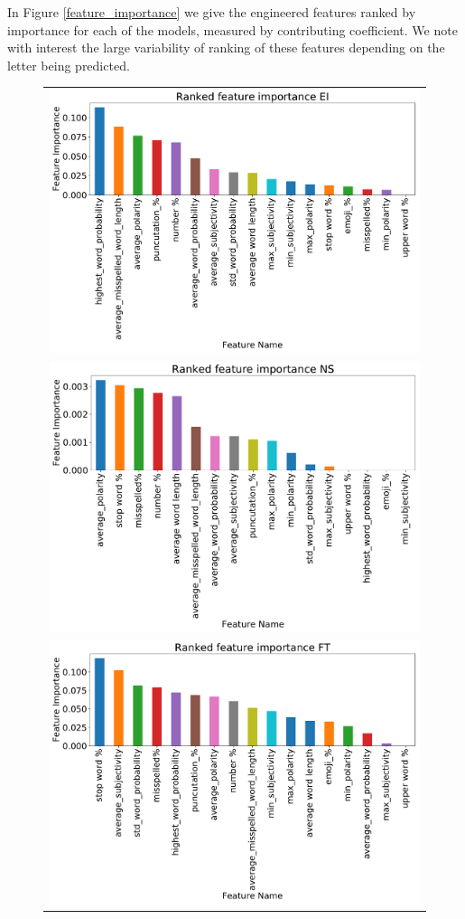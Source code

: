 \documentclass[sigconf, nonacm]{acmart}
\begin{document}
In Figure \ref{feature_importance} we give the engineered features ranked by importance for each of the models, measured by contributing coefficient. We note with interest the large variability of ranking of these features depending on the letter being predicted.


\begin{figure}
\begin{tabular}{c}
\includegraphics[width = 0.9\columnwidth]{EI.pdf} \\
\includegraphics[width = 0.9\columnwidth]{NS.pdf} \\
\includegraphics[width = 0.9\columnwidth]{FT.pdf} \\

\end{tabular}
\end{figure}
\end{document}
